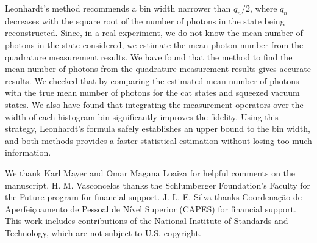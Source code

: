 \documentclass[
reprint,
superscriptaddress,
showpacs,
amsmath,
amssymb,
aps,
pra,
longbibliography
]{revtex4-1}
\begin{document}
Leonhardt's method recommends a bin width narrower than $q_n/2$, where
$q_n$ decreases with the square root of the number of photons in the
state being reconstructed.  Since, in a real experiment, we do not
know the mean number of photons in the state considered, we estimate
the mean photon number from the quadrature measurement results. We
have found that the method to find the mean number of photons
from the quadrature measurement results gives accurate results. We
checked that by comparing the estimated mean number of photons with
the true mean number of photons for the cat states and squeezed vacuum
states. We also have found that integrating the measurement operators
over the width of each histogram bin significantly improves the
fidelity. Using this strategy, Leonhardt's formula safely establishes
an upper bound to the bin width, and both methods provides a faster
statistical estimation without losing too much information.



\begin{acknowledgments}
  We thank Karl Mayer and Omar Magana Loaiza for helpful comments on
  the manuscript.  H. M. Vasconcelos thanks the Schlumberger
  Foundation's Faculty for the Future program for financial
  support. J. L. E. Silva thanks Coordena\c c\~ao de Aperfei\c
  coamento de Pessoal de N\'ivel Superior (CAPES) for financial
  support. This work includes contributions of the National Institute
  of Standards and Technology, which are not subject to
  U.S. copyright.
\end{acknowledgments}




%


\end{document}
